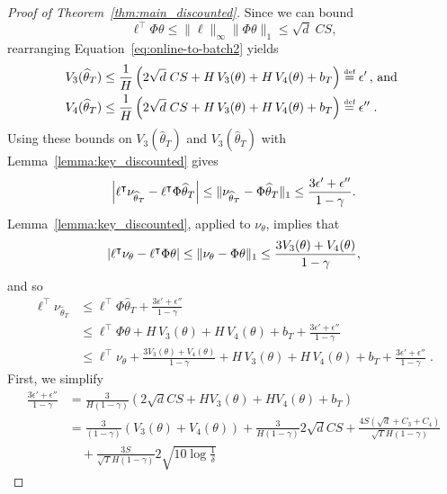 \documentclass[11pt]{article}
\newcommand{\df}{\stackrel{\mbox{\rm\tiny def}}{=}}
\begin{document}
\begin{proof}[Proof of Theorem~\ref{thm:main_discounted}]
Since we can bound
\begin{equation*}
  \ell^\top\Phi \theta \leq \|\ell\|_{\infty}\| \Phi \theta\|_1 \leq \sqrt{d} \; CS,
\end{equation*}
rearranging Equation~\eqref{eq:online-to-batch2} yields
\begin{align*}
V_3(\widehat \theta_T) &\le \frac{1}{H} \left( 2\sqrt{d} \; CS + H\, V_3(\theta)  + H\, V_4(\theta)+ b_T \right) \df \epsilon' \,\text{, and } \\
V_4(\widehat \theta_T) &\le \frac{1}{H} \left( 2\sqrt{d} \; CS+ H\, V_3(\theta)  + H\, V_4(\theta) + b_T \right) \df \epsilon'' \; .
\end{align*}
Using these bounds on $V_3(\widehat\theta_T)$ and $V_3(\widehat\theta_T)$ with Lemma~\ref{lemma:key_discounted} gives
\begin{equation*}
  \left\vert  \ell^{\intercal} \nu_{\widehat\theta_T} - \ell^\intercal \Phi \widehat\theta_T \right\vert \le
  \| \nu_{\widehat\theta_T} -\Phi \widehat\theta_T\|_1 \leq \frac{3 \epsilon' + \epsilon''}{1-\gamma}.
\end{equation*}
Lemma~\ref{lemma:key_discounted}, applied to $\nu_\theta$, implies that
\begin{equation*}
  \left\vert  \ell^{\intercal} \nu_{ \theta} - \ell^\intercal \Phi \theta \right\vert \le
  \| \nu_{\theta} -\Phi  \theta\|_1 \leq \frac{3 V_3(\theta) + V_4(\theta) }{1-\gamma},
\end{equation*}
and so
\begin{align*}
\ell^{\top} \nu_{\widehat\theta_T} &\leq  \ell^\top \Phi \widehat\theta_T + \frac{3 \epsilon' + \epsilon''}{1-\gamma} \\
& \leq \ell^\top\Phi\theta + H\, V_3(\theta)  + H\, V_4(\theta) + b_T  + \frac{3 \epsilon' + \epsilon''}{1-\gamma}  \\
&\le  \ell^{\top} \nu_{\theta} +\frac{3 V_3(\theta) + V_4(\theta) }{1-\gamma}  + H\, V_3(\theta)  + H\, V_4(\theta) + b_T  + \frac{3 \epsilon' + \epsilon''}{1-\gamma}\; .
\end{align*}
First, we simplify
\begin{align*}
    \frac{3\epsilon' + \epsilon''}{1-\gamma}
  &=
    \frac{3}{H(1-\gamma)} \left( 2\sqrt{d}CS+ H V_3(\theta)  + H V_4(\theta) + b_T \right)\\
  &=
    \frac{3}{(1-\gamma)}\left( V_3(\theta)  + V_4(\theta)\right)
    + \frac{3}{H(1-\gamma)}2\sqrt{d}CS
    +\frac{4S(\sqrt{d}+C_3+C_4)}{\sqrt{T}H(1-\gamma)}\\
  &\quad + \frac{3S}{\sqrt{T}H(1-\gamma)}2\sqrt{10 \log\frac{1}{\delta}}

\end{align*}
\end{proof}
\end{document}

